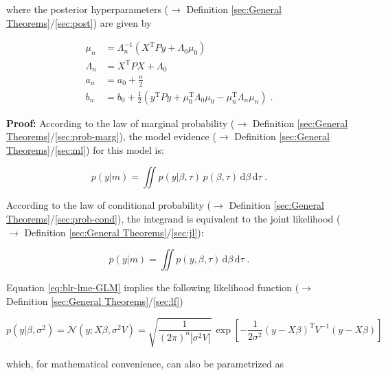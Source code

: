 \documentclass[a4paper,12pt,twoside]{book}
\begin{document}
where the posterior hyperparameters ($\rightarrow$ Definition \ref{sec:General Theorems}/\ref{sec:post}) are given by

\begin{equation} \label{eq:blr-lme-GLM-NG-post-par}
\begin{split}
\mu_n &= \Lambda_n^{-1} (X^\mathrm{T} P y + \Lambda_0 \mu_0) \\
\Lambda_n &= X^\mathrm{T} P X + \Lambda_0 \\
a_n &= a_0 + \frac{n}{2} \\
b_n &= b_0 + \frac{1}{2} (y^\mathrm{T} P y + \mu_0^\mathrm{T} \Lambda_0 \mu_0 - \mu_n^\mathrm{T} \Lambda_n \mu_n) \; .
\end{split}
\end{equation}


\vspace{1em}
\textbf{Proof:} According to the law of marginal probability ($\rightarrow$ Definition \ref{sec:General Theorems}/\ref{sec:prob-marg}), the model evidence ($\rightarrow$ Definition \ref{sec:General Theorems}/\ref{sec:ml}) for this model is:

\begin{equation} \label{eq:blr-lme-GLM-NG-ME-s1}
p(y|m) = \iint p(y|\beta,\tau) \, p(\beta,\tau) \, \mathrm{d}\beta \, \mathrm{d}\tau \; .
\end{equation}

According to the law of conditional probability ($\rightarrow$ Definition \ref{sec:General Theorems}/\ref{sec:prob-cond}), the integrand is equivalent to the joint likelihood ($\rightarrow$ Definition \ref{sec:General Theorems}/\ref{sec:jl}):

\begin{equation} \label{eq:blr-lme-GLM-NG-ME-s2}
p(y|m) = \iint p(y,\beta,\tau) \, \mathrm{d}\beta \, \mathrm{d}\tau \; .
\end{equation}

Equation \eqref{eq:blr-lme-GLM} implies the following likelihood function ($\rightarrow$ Definition \ref{sec:General Theorems}/\ref{sec:lf})

\begin{equation} \label{eq:blr-lme-GLM-LF-class}
p(y|\beta,\sigma^2) = \mathcal{N}(y; X \beta, \sigma^2 V) = \sqrt{\frac{1}{(2 \pi)^n |\sigma^2 V|}} \, \exp\left[ -\frac{1}{2 \sigma^2} (y-X\beta)^\mathrm{T} V^{-1} (y-X\beta) \right]
\end{equation}

which, for mathematical convenience, can also be parametrized as
\end{document}
